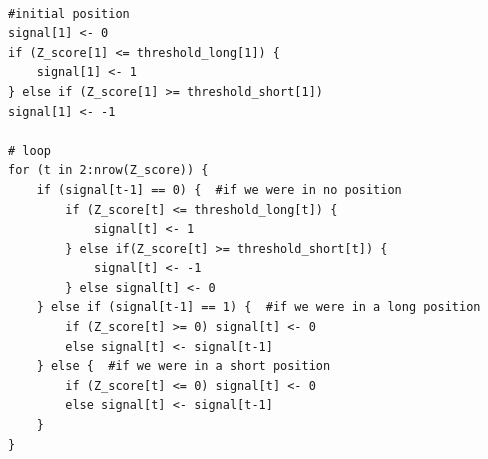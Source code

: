 \documentclass[]{article}
\begin{document}
\
\\\\\\\\\\\\
\begin{lstlisting}
#initial position
signal[1] <- 0
if (Z_score[1] <= threshold_long[1]) {
	signal[1] <- 1
} else if (Z_score[1] >= threshold_short[1])
signal[1] <- -1

# loop
for (t in 2:nrow(Z_score)) {
	if (signal[t-1] == 0) {  #if we were in no position
		if (Z_score[t] <= threshold_long[t]) {
			signal[t] <- 1
		} else if(Z_score[t] >= threshold_short[t]) {
			signal[t] <- -1
		} else signal[t] <- 0
	} else if (signal[t-1] == 1) {  #if we were in a long position
		if (Z_score[t] >= 0) signal[t] <- 0
		else signal[t] <- signal[t-1]
	} else {  #if we were in a short position
		if (Z_score[t] <= 0) signal[t] <- 0
		else signal[t] <- signal[t-1]
	}
}
\end{lstlisting}
\end{document}

